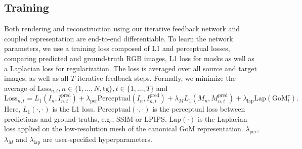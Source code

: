 \subsection{Training}
\label{sec:method:training}
Both rendering and reconstruction using our iterative feedback network and coupled representation are end-to-end differentiable. To learn the network parameters, we use a training loss composed of L1 and perceptual losses, comparing predicted and ground-truth RGB images, L1 loss for masks as well as a Laplacian loss for regularization. The loss is averaged over all source and target images, as well as all $T$ iterative feedback steps. Formally, we minimize the average of $\text{Loss}_{n,t}, n\in\{1, \dots, N, \text{tg}\}, t\in\{1, \dots, T\}$ and 
\begin{equation}
   \text{Loss}_{n, t} = L_1(I_n, I_{n, t}^\text{pred}) + \lambda_\text{per} \text{Perceptual}(I_n, I_{n, t}^\text{pred}) + \lambda_M L_1(M_n, M_{n, t}^\text{pred}) + \lambda_\text{lap} \text{Lap}(\text{GoM}_t^c).
\label{eq: loss}
\end{equation}
Here, $L_1(\cdot, \cdot)$ is the L1 loss. $\text{Perceptual}(\cdot, \cdot)$ is the perceptual loss between predictions and ground-truths, e.g., SSIM or LPIPS. $\text{Lap}(\cdot)$ is the Laplacian loss applied on the low-resolution mesh of the canonical GoM representation. $\lambda_\text{per}$,  $\lambda_M$ and $\lambda_\text{lap}$ are user-specified hyperparameters. 
